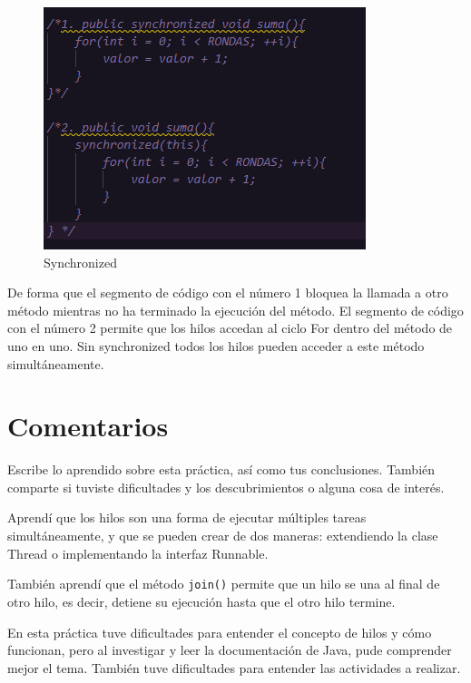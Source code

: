 \documentclass{article}
\begin{document}
\begin{enumerate}
    \begin{figure}
        \centering
        \includegraphics[width=\textwidth]{sincronized.png}
        \caption{Synchronized}
    \end{figure}
    De forma que el segmento de código con el número 1 bloquea la llamada a otro método mientras no ha terminado la ejecución del método. El segmento de código con el número 2 permite que los hilos accedan al ciclo For dentro del método de uno en uno. Sin synchronized todos los hilos pueden acceder a este método simultáneamente.
    
\end{enumerate}

\section{Comentarios}
Escribe lo aprendido sobre esta práctica, así como tus conclusiones. También comparte si tuviste dificultades y los descubrimientos o alguna cosa de interés.

Aprendí que los hilos son una forma de ejecutar múltiples tareas simultáneamente, y que se pueden crear de dos maneras: extendiendo la clase Thread o implementando la interfaz Runnable.

También aprendí que el método \texttt{join()} permite que un hilo se una al final de otro hilo, es decir, detiene su ejecución hasta que el otro hilo termine.

En esta práctica tuve dificultades para entender el concepto de hilos y cómo funcionan, pero al investigar y leer la documentación de Java, pude comprender mejor el tema. También tuve dificultades para entender las actividades a realizar.
\end{document}
